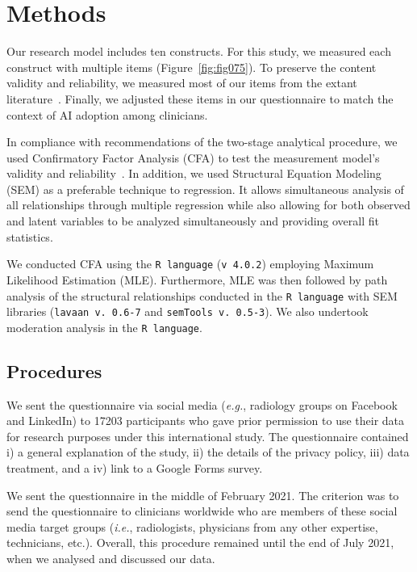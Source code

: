 \section{Methods}
\label{sec:chap004004}

Our research model includes ten constructs.
For this study, we measured each construct with multiple items (Figure~\ref{fig:fig075}).
To preserve the content validity and reliability, we measured most of our items from the extant literature~\cite{SOHN2020101324, info:doi/10.2196/14316}.
Finally, we adjusted these items in our questionnaire to match the context of AI adoption among clinicians.

In compliance with recommendations of the two-stage analytical procedure, we used Confirmatory Factor Analysis (CFA) to test the measurement model’s validity and reliability~\cite{2019-07124-034}.
In addition, we used Structural Equation Modeling (SEM) as a preferable technique to regression. It allows simultaneous analysis of all relationships through multiple regression while also allowing for both observed and latent variables to be analyzed simultaneously and providing overall fit statistics.

We conducted CFA using the \texttt{R language} (\texttt{v 4.0.2}) employing Maximum Likelihood Estimation (MLE).
Furthermore, MLE was then followed by path analysis of the structural relationships conducted in the \texttt{R language} with SEM libraries (\texttt{lavaan v. 0.6-7} and \texttt{semTools v. 0.5-3}).
We also undertook moderation analysis in the \texttt{R language}.

\subsection{Procedures}
\label{sec:chap004004001}

We sent the questionnaire via social media ({\it e.g.}, radiology groups on Facebook and LinkedIn) to 17203 participants who gave prior permission to use their data for research purposes under this international study.
The questionnaire contained i) a general explanation of the study, ii) the details of the privacy policy, iii) data treatment, and a iv) link to a Google Forms survey.

We sent the questionnaire in the middle of February 2021.
The criterion was to send the questionnaire to clinicians worldwide who are members of these social media target groups ({\it i.e.}, radiologists, physicians from any other expertise, technicians, etc.).
Overall, this procedure remained until the end of July 2021, when we analysed and discussed our data.


